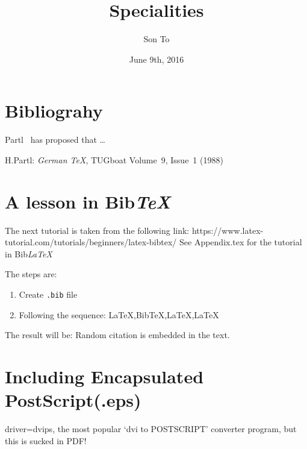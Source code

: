 \documentclass[a4paper,11pt]{article}
\author{Son To}
\date{June 9th, 2016}
\title{Specialities}
\begin{document}
  \maketitle
  \tableofcontents
  \newpage
  \section{Bibliograhy}
Partl~\cite{pa} has
proposed that \ldots
  \begin{thebibliography}{99}
    H.Partl:
    \emph{German \TeX},
    TUGboat Volume~9, Issue~1 (1988)
  \end{thebibliography}

\section{A lesson in Bib\emph{TeX}}
The next tutorial is taken from the
following link:
\bigbreak
https://www.latex-tutorial.com/tutorials/beginners/latex-bibtex/
\flushleft
See Appendix.tex for the tutorial in Bib\emph{LaTeX}

The steps are:
\flushleft
\begin{enumerate}
  \item Create \verb+.bib+ file
  \item Following the sequence: La\TeX,Bib\TeX,La\TeX,La\TeX
\end{enumerate}
The result will be:
Random citation \cite{DUMMY:1} is embedded in the text.
\newpage



\section{Including Encapsulated PostScript(.eps)}
driver=dvips, the most popular `dvi to POSTSCRIPT'
converter program, but this is sucked in PDF!
\end{document}
